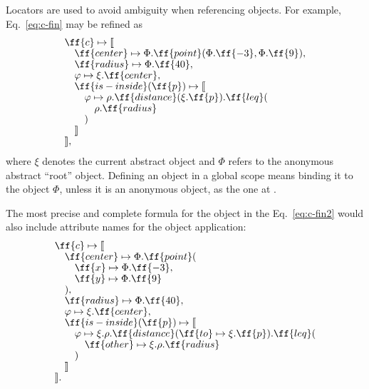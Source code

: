 Locators are used to avoid ambiguity when referencing objects.
For example, Eq.~\ref{eq:c-fin} may be refined as
\begin{equation}
\begin{split}
& \ff{c} \mapsto \llbracket \br
& \quad \ff{center} \mapsto \Phi.\ff{point}(\Phi.\ff{-3}, \Phi.\ff{9}), \br
& \quad \ff{radius} \mapsto \Phi.\ff{40}, \br
& \quad \varphi \mapsto \xi.\ff{center}, \br
& \quad \ff{is-inside}(\ff{p}) \mapsto \llbracket \br
& \quad \quad \varphi \mapsto \rho.\ff{distance}(\xi.\ff{p}).\ff{leq}( \br
& \quad \quad \quad \rho.\ff{radius} \br
& \quad \quad ) \br
& \quad \rrbracket \br
& \rrbracket,
\end{split}
\end{equation}
where $\xi$ denotes the current abstract object
and $\Phi$ refers to the anonymous abstract ``root'' object.
Defining an object in a global scope
means binding it to the object $\Phi$, unless it is an anonymous
object, as the one at .

The most precise and complete formula for the object in the
Eq.~\ref{eq:c-fin2} would also include attribute names for
the object application:
\begin{equation}
\begin{split}
& \ff{c} \mapsto \llbracket \br
& \quad \ff{center} \mapsto \Phi.\ff{point}( \br
& \quad \quad \ff{x} \mapsto \Phi.\ff{-3}, \br
& \quad \quad \ff{y} \mapsto \Phi.\ff{9} \br
& \quad ), \br
& \quad \ff{radius} \mapsto \Phi.\ff{40}, \br
& \quad \varphi \mapsto \xi.\ff{center}, \br
& \quad \ff{is-inside}(\ff{p}) \mapsto \llbracket \br
& \quad \quad \varphi \mapsto \xi.\rho.\ff{distance}(\ff{to} \mapsto \xi.\ff{p}).\ff{leq}( \br
& \quad \quad \quad \ff{other} \mapsto \xi.\rho.\ff{radius} \br
& \quad \quad ) \br
& \quad \rrbracket \br
& \rrbracket.
\end{split}
\end{equation}



